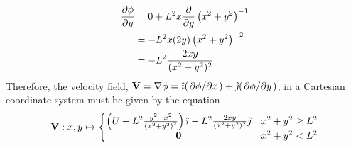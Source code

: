\begin{align*}
    \pdv{\phi}{y}&=0+L^2x\pdv{y}\left(x^2+y^2\right)^{-1}\\
    &=-L^2x(2y)\left(x^2+y^2\right)^{-2}\\
    &=-L^2\frac{2xy}{(x^2+y^2)^2}
\end{align*}
Therefore, the velocity field, $\mathbf{V}=\nabla\phi=\hat{\imath}(\pdv*{\phi}{x})+\hat{\jmath}(\pdv*{\phi}{y})$, in a Cartesian coordinate system must be given by the equation
$$
    \mathbf{V}:x,y\mapsto\left\{\begin{matrix}
        \left(U+L^2\frac{y^2-x^2}{\left(x^2+y^2\right)^2}\right)\hat{\imath}-L^2\frac{2xy}{(x^2+y^2)^2}\hat{\jmath}&x^2+y^2\geq L^2\\
        \mathbf{0}&x^2+y^2<L^2
    \end{matrix}\right.
$$

